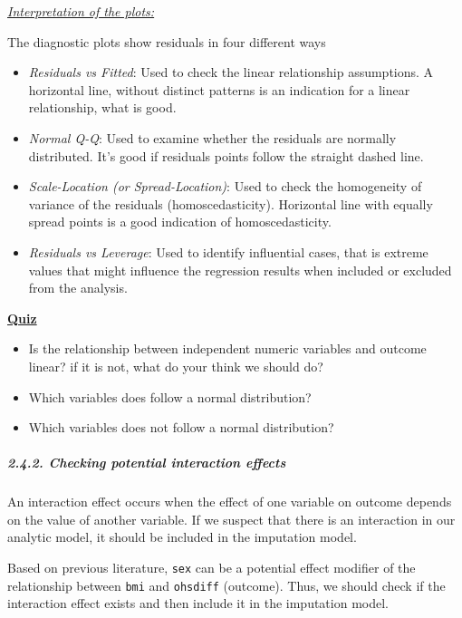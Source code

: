 \documentclass[
]{article}
\providecommand{\tightlist}{%
  \setlength{\itemsep}{0pt}\setlength{\parskip}{0pt}}
\begin{document}
\ul{\emph{Interpretation of the plots:}}

The diagnostic plots show residuals in four different ways

\begin{itemize}
\tightlist
\item
  \emph{Residuals vs Fitted}: Used to check the linear relationship
  assumptions. A horizontal line, without distinct patterns is an
  indication for a linear relationship, what is good.
\item
  \emph{Normal Q-Q}: Used to examine whether the residuals are normally
  distributed. It's good if residuals points follow the straight dashed
  line.
\item
  \emph{Scale-Location (or Spread-Location)}: Used to check the
  homogeneity of variance of the residuals (homoscedasticity).
  Horizontal line with equally spread points is a good indication of
  homoscedasticity.
\item
  \emph{Residuals vs Leverage}: Used to identify influential cases, that
  is extreme values that might influence the regression results when
  included or excluded from the analysis.
\end{itemize}

\ul{\textbf{Quiz}}

\begin{itemize}
\item
  Is the relationship between independent numeric variables and outcome
  linear? if it is not, what do your think we should do?
\item
  Which variables does follow a normal distribution?
\item
  Which variables does not follow a normal distribution?
\end{itemize}

\hypertarget{checking-potential-interaction-effects}{%
\subparagraph{2.4.2. Checking potential interaction
effects}\label{checking-potential-interaction-effects}}

An interaction effect occurs when the effect of one variable on outcome
depends on the value of another variable. If we suspect that there is an
interaction in our analytic model, it should be included in the
imputation model.

Based on previous literature, \texttt{sex} can be a potential effect
modifier of the relationship between \texttt{bmi} and \texttt{ohsdiff}
(outcome). Thus, we should check if the interaction effect exists and
then include it in the imputation model.
\end{document}
